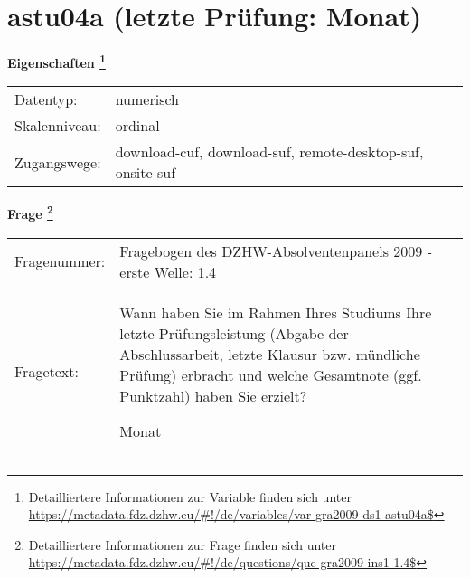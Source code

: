 
    \setcounter{footnote}{0}

    \vspace*{-1.8cm}
	\section{astu04a (letzte Prüfung: Monat)}
	\label{section:astu04a}



    \vspace*{0.5cm}
    \noindent\textbf{Eigenschaften
	\footnote{Detailliertere Informationen zur Variable finden sich unter
		\url{https://metadata.fdz.dzhw.eu/\#!/de/variables/var-gra2009-ds1-astu04a$}}}\\
	\begin{tabularx}{\hsize}{@{}lX}
	Datentyp: & numerisch \\
	Skalenniveau: & ordinal \\
	Zugangswege: &
	  download-cuf, 
	  download-suf, 
	  remote-desktop-suf, 
	  onsite-suf
 \\
    \end{tabularx}



				\vspace*{0.5cm}
                \noindent\textbf{Frage
	                \footnote{Detailliertere Informationen zur Frage finden sich unter
		              \url{https://metadata.fdz.dzhw.eu/\#!/de/questions/que-gra2009-ins1-1.4$}}}\\
				\begin{tabularx}{\hsize}{@{}lX}
					Fragenummer: &
					  Fragebogen des DZHW-Absolventenpanels 2009 - erste Welle:
					  1.4
 \\
					Fragetext: & Wann haben Sie im Rahmen Ihres Studiums Ihre letzte Prüfungsleistung (Abgabe der Abschlussarbeit, letzte Klausur bzw. mündliche Prüfung) erbracht und welche Gesamtnote (ggf. Punktzahl) haben Sie erzielt?\par  Monat \\
				\end{tabularx}





